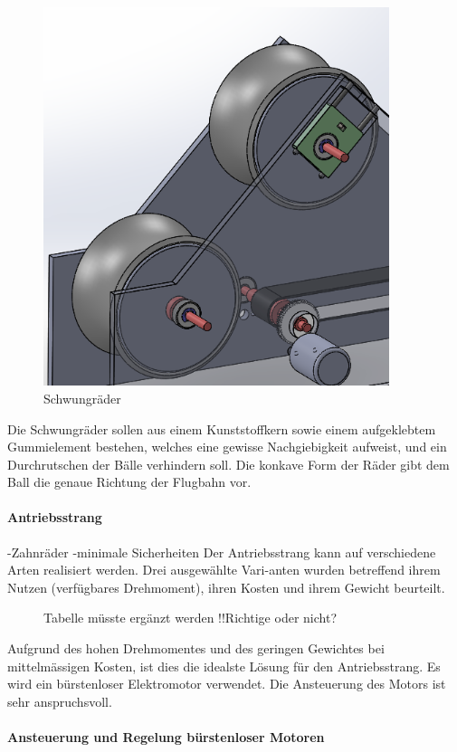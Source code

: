 \begin{figure}[h!]
	\centering
	\includegraphics[width=0.9\textwidth]{Enddokumentation/Loesungskonzept/Bilder/Schwungraeder.png}
	\caption{Schwungräder}
	\label{fig:Schwungräder}	
\end{figure}
Die Schwungräder sollen aus einem Kunststoffkern sowie einem aufgeklebtem Gummielement bestehen, welches eine gewisse Nachgiebigkeit aufweist, und ein Durchrutschen der Bälle verhindern soll.  Die konkave Form der Räder gibt dem Ball die genaue Richtung der Flugbahn vor.
\paragraph{Antriebsstrang}
-Zahnräder
-minimale Sicherheiten
Der Antriebsstrang kann auf verschiedene Arten realisiert werden. Drei ausgewählte Vari-anten wurden betreffend ihrem Nutzen (verfügbares Drehmoment), ihren Kosten und ihrem Gewicht beurteilt.
\begin{figure}

	\centering
	\label{tab:Antriebsstrang}
	Tabelle müsste ergänzt werden !!Richtige oder nicht?
\end{figure}

Aufgrund des hohen Drehmomentes und des geringen Gewichtes bei mittelmässigen Kosten, ist dies die idealste Lösung für den Antriebsstrang. Es wird ein bürstenloser Elektromotor verwendet. Die Ansteuerung des Motors ist sehr anspruchsvoll.

\paragraph{Ansteuerung und Regelung bürstenloser Motoren}
